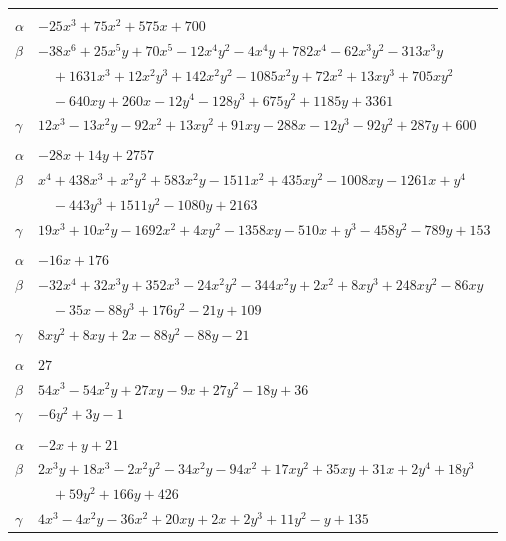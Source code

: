 \documentclass[11pt]{article}
\begin{document}
\begin{longtable}{@{}ll@{}}
\addlinespace[3pt]
\multicolumn{2}{@{}l}{$\{i,j\}=\{37,53\}$, $k_{ij}=2^{2}\cdot 3\cdot 5^{2}\cdot 13$}\\
$\alpha$ & $-25x^{3}+75x^{2}+575x+700$\\
$\beta$ & $-38x^{6}+25x^{5}y+70x^{5}-12x^{4}y^{2}-4x^{4}y+782x^{4}-62x^{3}y^{2}-313x^{3}y$\\
 & $\quad +1631x^{3}+12x^{2}y^{3}+142x^{2}y^{2}-1085x^{2}y+72x^{2}+13xy^{3}+705xy^{2}$\\
 & $\quad -640xy+260x-12y^{4}-128y^{3}+675y^{2}+1185y+3361$\\
$\gamma$ & $12x^{3}-13x^{2}y-92x^{2}+13xy^{2}+91xy-288x-12y^{3}-92y^{2}+287y+600$\\
\addlinespace[3pt]
\multicolumn{2}{@{}l}{$\{i,j\}=\{37,62\}$, $k_{ij}=2^{3}\cdot 3^{4}\cdot 13$}\\
$\alpha$ & $-28x+14y+2757$\\
$\beta$ & $x^{4}+438x^{3}+x^{2}y^{2}+583x^{2}y-1511x^{2}+435xy^{2}-1008xy-1261x+y^{4}$\\
 & $\quad -443y^{3}+1511y^{2}-1080y+2163$\\
$\gamma$ & $19x^{3}+10x^{2}y-1692x^{2}+4xy^{2}-1358xy-510x+y^{3}-458y^{2}-789y+153$\\
\addlinespace[3pt]
\multicolumn{2}{@{}l}{$\{i,j\}=\{37,76\}$, $k_{ij}=3\cdot 13^{2}$}\\
$\alpha$ & $-16x+176$\\
$\beta$ & $-32x^{4}+32x^{3}y+352x^{3}-24x^{2}y^{2}-344x^{2}y+2x^{2}+8xy^{3}+248xy^{2}-86xy$\\
 & $\quad -35x-88y^{3}+176y^{2}-21y+109$\\
$\gamma$ & $8xy^{2}+8xy+2x-88y^{2}-88y-21$\\
\addlinespace[3pt]
\multicolumn{2}{@{}l}{$\{i,j\}=\{37,84\}$, $k_{ij}=2\cdot 3\cdot 13$}\\
$\alpha$ & $27$\\
$\beta$ & $54x^{3}-54x^{2}y+27xy-9x+27y^{2}-18y+36$\\
$\gamma$ & $-6y^{2}+3y-1$\\
\addlinespace[3pt]
\multicolumn{2}{@{}l}{$\{i,j\}=\{37,87\}$, $k_{ij}=2^{2}\cdot 3^{2}\cdot 13$}\\
$\alpha$ & $-2x+y+21$\\
$\beta$ & $2x^{3}y+18x^{3}-2x^{2}y^{2}-34x^{2}y-94x^{2}+17xy^{2}+35xy+31x+2y^{4}+18y^{3}$\\
 & $\quad +59y^{2}+166y+426$\\
$\gamma$ & $4x^{3}-4x^{2}y-36x^{2}+20xy+2x+2y^{3}+11y^{2}-y+135$\\

\end{longtable}
\end{document}
